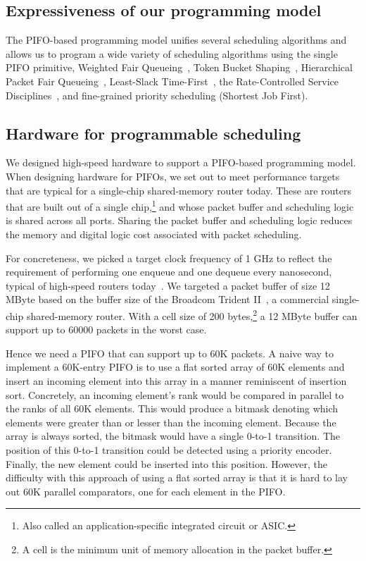 \subsection{Expressiveness of our programming model}

The PIFO-based programming model unifies several scheduling algorithms and
allows us to program a wide variety of scheduling algorithms using the single
PIFO primitive, \eg Weighted Fair Queueing~\cite{wfq}, Token Bucket
Shaping~\cite{tbf}, Hierarchical Packet Fair Queueing~\cite{hpfq}, Least-Slack
Time-First~\cite{lstf}, the Rate-Controlled Service Disciplines~\cite{rcsd},
and fine-grained priority scheduling (\eg Shortest Job First).

\subsection{Hardware for programmable scheduling}
\label{ss:intro_pifo_hardware}

We designed high-speed hardware to support a PIFO-based programming model. When
designing hardware for PIFOs, we set out to meet performance targets that are
typical for a single-chip shared-memory router today. These are routers that
are built out of a single chip,\footnote{Also called an application-specific integrated
circuit or ASIC.} and whose packet buffer and scheduling logic is shared across
all ports. Sharing the packet buffer and scheduling logic reduces the memory
and digital logic cost associated with packet scheduling.

For concreteness, we picked a target clock frequency of 1 GHz to reflect the
requirement of performing one enqueue and one dequeue every nanosecond, typical
of high-speed routers today~\cite{rmt}. We targeted a packet buffer of size 12
MByte based on the buffer size of the Broadcom Trident II~\cite{bcom_buffer}, a
commercial single-chip shared-memory router. With a cell size of 200
bytes,\footnote{A cell is the minimum unit of memory allocation in the packet
buffer.} a 12 MByte buffer can support up to 60000 packets in the worst case.

Hence we need a PIFO that can support up to 60K packets. A naive way to
implement a 60K-entry PIFO is to use a flat sorted array of 60K elements and
insert an incoming element into this array in a manner reminiscent of insertion
sort. Concretely, an incoming element's rank would be compared in parallel to
the ranks of all 60K elements. This would produce a bitmask denoting which
elements were greater than or lesser than the incoming element.  Because the
array is always sorted, the bitmask would have a single 0-to-1 transition.  The
position of this 0-to-1 transition could be detected using a priority encoder.
Finally, the new element could be inserted into this position.  However, the
difficulty with this approach of using a flat sorted array is that it is hard to lay out 60K parallel
comparators, one for each element in the PIFO.

